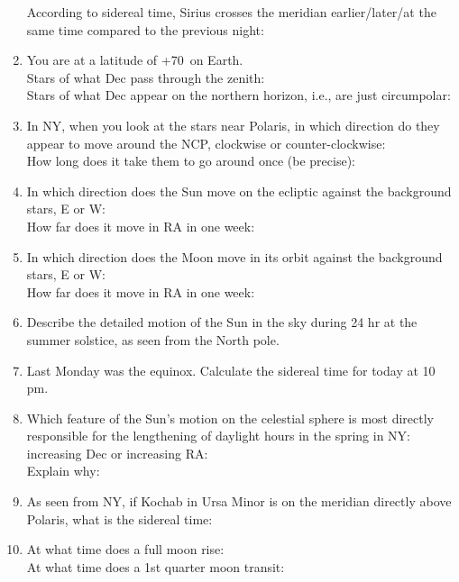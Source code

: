 \documentclass[11pt]{article}
\begin{document}
\begin{enumerate}
\vskip 0.5cm
According to sidereal time, Sirius crosses the meridian earlier/later/at the
same time compared to the previous night: 

\vskip 1.0cm
\item
You are at a latitude of +70\deg\ on Earth. \\
Stars of what Dec pass through the zenith:\\
Stars of what Dec appear on the northern horizon, i.e., are just circumpolar:

\vskip 1.0cm
\item
In NY, when you look at the stars near Polaris, in which direction do
they appear to move around the 
NCP, clockwise or counter-clockwise: \\
How long does it take them to go around once (be precise):

 
\vskip 1.0cm
\item
In which direction does the Sun move on the ecliptic against the background stars, E or
W: \\
How far does it move in RA in one week:


\vskip 1.0cm
\item
In which direction does the Moon move in its orbit against the
background stars, E or W: \\
How far does it move in RA in one week:


\vskip 1.0cm
\item
Describe the detailed motion of the Sun in the sky during 24 hr at the summer
solstice, as seen from the North pole.

\vskip 1.0cm
\item
Last Monday was the equinox. Calculate the sidereal time for today  at 10 pm.


 
\vskip 1.0cm
\item
Which feature of the Sun's motion on the celestial sphere is most
directly responsible for the lengthening of daylight hours in the
spring in NY: increasing Dec or increasing RA: \\
Explain why:


\vskip 1.0cm
\item
As seen from NY, if Kochab in Ursa Minor is
on the meridian directly above Polaris, what is the sidereal time:


\vskip 1.0cm
\item
At what time does a full moon rise: \\
At what time does a 1st quarter moon transit:  \\


\end{enumerate}
\end{document}
